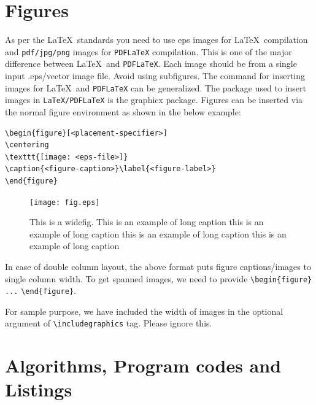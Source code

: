 \documentclass[lineno,pdflatex,sn-nature]{sn-jnl}%
\theoremstyle{thmstyleone}%
\theoremstyle{thmstyletwo}%
\theoremstyle{thmstylethree}%
\begin{document}
\section{Figures}\label{sec6}

As per the \LaTeX\ standards you need to use eps images for \LaTeX\ compilation and \verb+pdf/jpg/png+ images for \verb+PDFLaTeX+ compilation. This is one of the major difference between \LaTeX\ and \verb+PDFLaTeX+. Each image should be from a single input .eps/vector image file. Avoid using subfigures. The command for inserting images for \LaTeX\ and \verb+PDFLaTeX+ can be generalized. The package used to insert images in \verb+LaTeX/PDFLaTeX+ is the graphicx package. Figures can be inserted via the normal figure environment as shown in the below example:

\bigskip
\begin{verbatim}
\begin{figure}[<placement-specifier>]
\centering
\texttt{[image: <eps-file>]}
\caption{<figure-caption>}\label{<figure-label>}
\end{figure}
\end{verbatim}
\bigskip

\begin{figure}[h]
\centering
\texttt{[image: fig.eps]}
\caption{This is a widefig. This is an example of long caption this is an example of long caption  this is an example of long caption this is an example of long caption}\label{fig1}
\end{figure}

In case of double column layout, the above format puts figure captions/images to single column width. To get spanned images, we need to provide \verb+\begin{figure}+ \verb+...+ \verb+\end{figure}+.

For sample purpose, we have included the width of images in the optional argument of \verb+\includegraphics+ tag. Please ignore this. 

\section{Algorithms, Program codes and Listings}\label{sec7}
\end{document}
